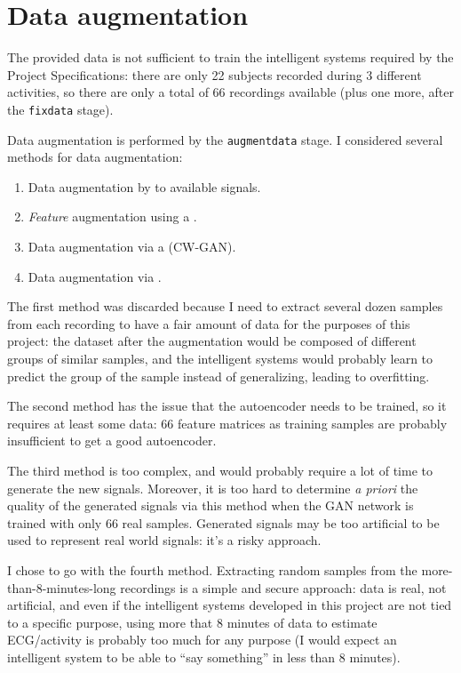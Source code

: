 \section{Data augmentation}\label{sec:augmentdata}

The provided data is not sufficient to train the intelligent systems required
by the Project Specifications: there are only 22 subjects recorded during 3
different activities, so there are only a total of 66 recordings available
(plus one more, after the \texttt{fixdata} stage).

Data augmentation is performed by the \texttt{augmentdata} stage. I considered
several methods for data augmentation:
\begin{enumerate}
\item Data augmentation by  to
	available signals.
\item \emph{Feature} augmentation using a .
\item Data augmentation via a  (CW-GAN).
\item Data augmentation via .
\end{enumerate}

The first method was discarded because I need to extract several dozen samples
from each recording to have a fair amount of data for the purposes of this
project: the dataset after the augmentation would be composed of different
groups of similar samples, and the intelligent systems would probably learn to
predict the group of the sample instead of generalizing, leading to
overfitting.

The second method has the issue that the autoencoder needs to be trained, so it
requires at least some data: 66 feature matrices as training samples are
probably insufficient to get a good autoencoder.

The third method is too complex, and would probably require a lot of time to
generate the new signals. Moreover, it is too hard to determine \emph{a priori}
the quality of the generated signals via this method when the GAN network is
trained with only 66 real samples. Generated signals may be too artificial to
be used to represent real world signals: it's a risky approach.

I chose to go with the fourth method. Extracting random samples from the
more-than-8-minutes-long recordings is a simple and secure approach: data is
real, not artificial, and even if the intelligent systems developed in this
project are not tied to a specific purpose, using more that 8 minutes of data
to estimate ECG/activity is probably too much for any purpose (I would expect
an intelligent system to be able to ``say something'' in less than 8 minutes).

